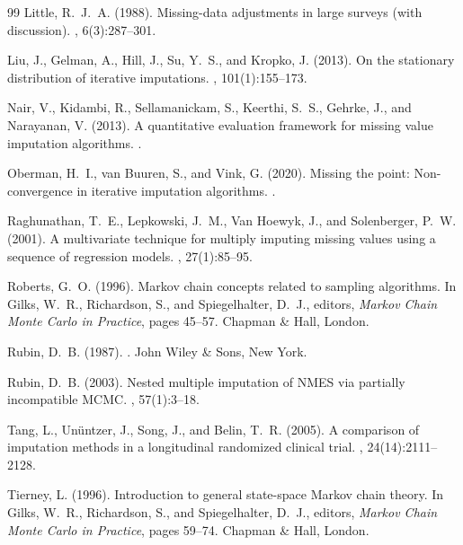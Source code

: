 \documentclass[
]{book}
\begin{document}
\begin{thebibliography}{99}
Little, R.~J.~A. (1988).
\newblock Missing-data adjustments in large surveys (with discussion).
, 6(3):287--301.

Liu, J., Gelman, A., Hill, J., Su, Y.~S., and Kropko, J. (2013).
\newblock On the stationary distribution of iterative imputations.
, 101(1):155--173.

Nair, V., Kidambi, R., Sellamanickam, S., Keerthi, S.~S., Gehrke, J., and Narayanan, V. (2013).
\newblock A quantitative evaluation framework for missing value imputation algorithms.
.

Oberman, H.~I., {van Buuren}, S., and Vink, G. (2020).
\newblock Missing the point: Non-convergence in iterative imputation algorithms.
.

Raghunathan, T.~E., Lepkowski, J.~M., Van Hoewyk, J., and Solenberger, P.~W. (2001).
\newblock A multivariate technique for multiply imputing missing values using a sequence of regression models.
, 27(1):85--95.

Roberts, G.~O. (1996).
\newblock Markov chain concepts related to sampling algorithms.
\newblock In Gilks, W.~R., Richardson, S., and Spiegelhalter, D.~J., editors, {\em Markov Chain {M}onte {C}arlo in Practice}, pages 45--57. Chapman \& Hall, London.

Rubin, D.~B. (1987).
.
\newblock John Wiley \& Sons, New York.

Rubin, D.~B. (2003).
\newblock Nested multiple imputation of {NMES} via partially incompatible {MCMC}.
, 57(1):3--18.

Tang, L., Un\"untzer, J., Song, J., and Belin, T.~R. (2005).
\newblock A comparison of imputation methods in a longitudinal randomized clinical trial.
, 24(14):2111--2128.

Tierney, L. (1996).
\newblock Introduction to general state-space {M}arkov chain theory.
\newblock In Gilks, W.~R., Richardson, S., and Spiegelhalter, D.~J., editors, {\em Markov Chain Monte Carlo in Practice}, pages 59--74. Chapman \& Hall, London.


\end{thebibliography}
\end{document}
